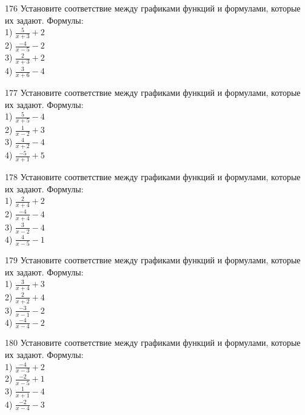 \documentclass[4apaper]{article}
\begin{document}
\begin{taskBN}{176}
Установите соответствие между графиками функций и формулами, которые их задают. Формулы: \\1) $\frac{5}{x+3}+2$\\2) $\frac{-4}{x-5}-2$\\3) $\frac{2}{x+3}+2$\\4) $\frac{3}{x+6}-4$
\end{taskBN}

\begin{taskBN}{177}
Установите соответствие между графиками функций и формулами, которые их задают. Формулы: \\1) $\frac{5}{x+5}-4$\\2) $\frac{1}{x-2}+3$\\3) $\frac{4}{x+2}-4$\\4) $\frac{-5}{x+1}+5$
\end{taskBN}

\begin{taskBN}{178}
Установите соответствие между графиками функций и формулами, которые их задают. Формулы: \\1) $\frac{2}{x+4}+2$\\2) $\frac{-4}{x+4}-4$\\3) $\frac{3}{x-2}-4$\\4) $\frac{4}{x-5}-1$
\end{taskBN}

\begin{taskBN}{179}
Установите соответствие между графиками функций и формулами, которые их задают. Формулы: \\1) $\frac{3}{x+4}+3$\\2) $\frac{2}{x+2}+4$\\3) $\frac{-3}{x-1}-2$\\4) $\frac{-4}{x-4}-2$
\end{taskBN}

\begin{taskBN}{180}
Установите соответствие между графиками функций и формулами, которые их задают. Формулы: \\1) $\frac{-4}{x-3}+2$\\2) $\frac{-2}{x-5}+1$\\3) $\frac{1}{x+1}-4$\\4) $\frac{-2}{x-4}-3$
\end{taskBN}
\end{document}
